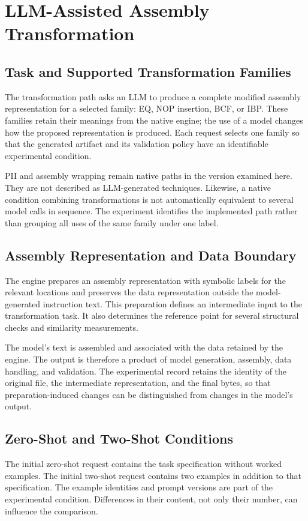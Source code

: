 \section{LLM-Assisted Assembly Transformation}\label{sec:llm}
\subsection{Task and Supported Transformation Families}
The transformation path asks an LLM to produce a complete modified
assembly representation for a selected family: EQ, NOP insertion, BCF,
or IBP. These families retain their meanings from the native engine;
the use of a model changes how the proposed representation is produced.
Each request selects one family so that the generated artifact and its
validation policy have an identifiable experimental condition.

PII and assembly wrapping remain native paths in the version examined
here. They are not described as LLM-generated techniques. Likewise, a
native condition combining transformations is not automatically
equivalent to several model calls in sequence. The experiment identifies
the implemented path rather than grouping all uses of the same family
under one label.

\subsection{Assembly Representation and Data Boundary}
The engine prepares an assembly representation with symbolic labels
for the relevant locations and preserves the data representation
outside the model-generated instruction text. This preparation defines
an intermediate input to the transformation task. It also determines
the reference point for several structural checks and similarity
measurements.

The model's text is assembled and associated with the data retained by
the engine. The output is therefore a product of model generation,
assembly, data handling, and validation. The experimental record retains
the identity of the original file, the intermediate representation,
and the final bytes, so that preparation-induced changes can be
distinguished from changes in the model's output.

\subsection{Zero-Shot and Two-Shot Conditions}
The initial zero-shot request contains the task specification without
worked examples. The initial two-shot request contains two examples
in addition to that specification. The example identities and prompt
versions are part of the experimental condition. Differences in their
content, not only their number, can influence the comparison.

